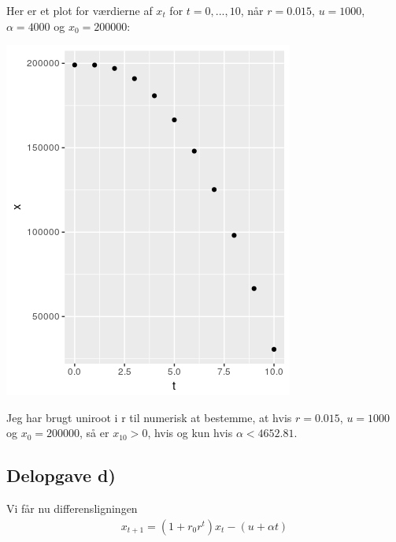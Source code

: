 \documentclass[12pt]{article}
\begin{document}
Her er et plot for værdierne af $x_t$ for $t=0,...,10$, når $r=0.015$, $u=1000$, $\alpha=4000$ og $x_0=200000$:
\begin{center}
\includegraphics[scale=0.5]{q1p2.png}
\end{center}

Jeg har brugt uniroot i r til numerisk at bestemme, at hvis $r=0.015$, $u=1000$ og $x_0=200000$, så er $x_10>0$, hvis og kun hvis $\alpha<4652.81$.

\subsection{Delopgave d)}

Vi får nu differensligningen
\begin{align}
x_{t+1} = (1 + r_0r^t)x_t - (u + \alpha t)
\end{align}
\end{document}
